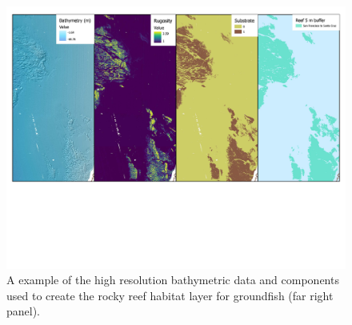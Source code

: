 \documentclass[
  12pt,
  authoryear,
  preprint,
  3p]{elsarticle}
\begin{document}
\begin{figure}

{\centering \includegraphics{figures/map_2.jpg}

}

\caption{\label{fig-map2}A example of the high resolution bathymetric
data and components used to create the rocky reef habitat layer for
groundfish (far right panel).}

\end{figure}
\end{document}
